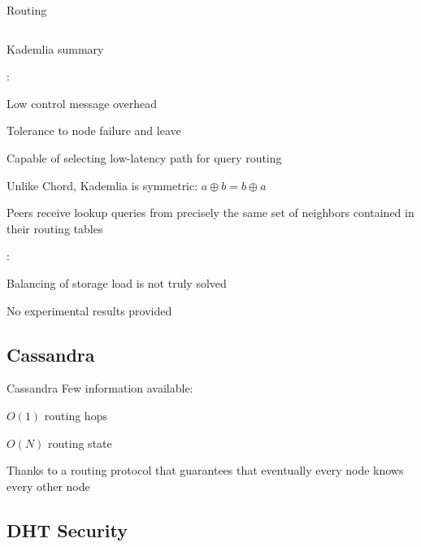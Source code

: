 \begin{frame}{Routing}
\begin{columns}
\begin{column}{0.35\textwidth}
\end{column}
\end{columns}

\end{frame}


\begin{frame}{Kademlia summary}
	
:\\
\BI
\item Low control message overhead
\item Tolerance to node failure and leave
\item Capable of selecting low-latency path for query routing
\item Unlike Chord, Kademlia is symmetric: $a \oplus b = b \oplus a$
\BI
\item Peers receive lookup queries from precisely the same set of neighbors contained in their routing tables
\EI
\EI

\smallskip
{}:
\BI
\item Balancing of storage load is not truly solved
\item No experimental results provided
\EI


\end{frame}

\subsection{Cassandra}

\begin{frame}{Cassandra}
Few information available:\\
\BIL
\item $O(1)$ routing hops
\item $O(N)$ routing state
\BI
\item Thanks to a routing protocol that guarantees that eventually
every node knows every other node
\EI
\EIL

\begin{Bib}
{\scriptsize
}
\end{Bib}
\end{frame}

\subsection{DHT Security}

